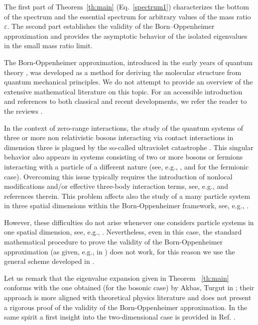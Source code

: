 \documentclass[a4paper,11pt,reqno]{amsart}
\theoremstyle{definition}
\numberwithin{equation}{section}
\begin{document}
The first part of Theorem~\ref{th:main} (Eq.~\eqref{spectrum1}) characterizes the bottom of the spectrum and the essential spectrum for arbitrary values of the mass ratio~$\varepsilon$. The second part establishes the validity of the Born--Oppenheimer approximation and provides the asymptotic behavior of the isolated eigenvalues in the small mass ratio limit.  

The Born-Oppenheimer approximation, introduced in the early years of quantum theory \cite{BO27}, was developed as a method for deriving the molecular structure from quantum mechanical principles. We do not attempt to provide an overview of the extensive mathematical literature on this topic. For an accessible introduction and references to both classical and recent developments, we refer the reader to the reviews \cite{HJ07, jecko14}.

In the context of zero-range interactions, the study of the quantum systems of three or more non relativistic bosons interacting via contact interactions in dimension three is plagued by the so-called ultraviolet catastrophe \cite{MF62a, MF62b, thomas}. This singular behavior also appears in systems consisting of two or more bosons or fermions interacting with a particle of a different nature (see, e.g., \cite{FT24a}, and \cite{Becker2018,CDFMT12,CDFMT15,CFT15, Yoshitomi17} for the fermionic case). Overcoming this issue typically requires the introduction of nonlocal modifications and/or effective three-body interaction terms, see, e.g., \cite{BCFTahp23, FT23,  FT24b, FT24a, FST24, Saberbaghi2025} and references therein. This problem  affects also the study of  a many particle system in three spatial dimensions within the Born-Oppenheimer framework, see, e.g., \cite{FST24}. 

However, these difficulties  do not arise whenever one considers particle systems in one spatial dimension, see, e.g.,  \cite{BCFTjmp18, GHL20}. Nevertheless, even in this case, the standard mathematical procedure to prove the validity of the Born-Oppenheimer approximation (as given, e.g., in \cite{CDS}) does not work, for this reason we use the general scheme developed in \cite{Krejcirik-etal-m2018}.

Let us remark that the eigenvalue expansion given in Theorem ~\ref{th:main} conforms with the one obtained (for the bosonic case) by Akbas, Turgut in  \cite{AT1}; their approach is more aligned with theoretical physics literature and does not present a rigorous proof of the validity of the Born-Oppenheimer approximation. In the same spirit a first insight into the two-dimensional case is provided in Ref.   \cite{AT2}.
\end{document}
